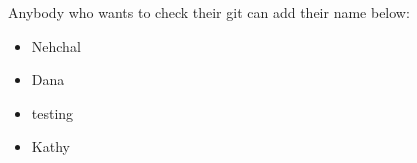 \documentclass[11pt]{article}
\begin{document}
Anybody who wants to check their git can add their name below:
\begin{itemize}
    \item Nehchal
    \item Dana
    \item testing
    \item Kathy
\end{itemize}
\end{document}
